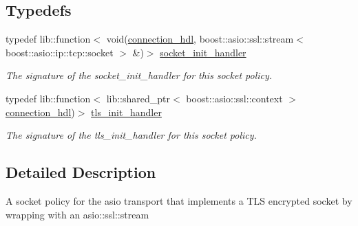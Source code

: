 \subsection*{Typedefs}
\begin{DoxyCompactItemize}
\item 
typedef lib\+::function$<$ void(\hyperlink{namespacewebsocketpp_a6b3d26a10ee7229b84b776786332631d}{connection\+\_\+hdl}, boost\+::asio\+::ssl\+::stream$<$ boost\+::asio\+::ip\+::tcp\+::socket $>$ \&)$>$ \hyperlink{namespacewebsocketpp_1_1transport_1_1asio_1_1tls__socket_a1d7e715c2f7c5fc7add88d6a37724abb}{socket\+\_\+init\+\_\+handler}\hypertarget{namespacewebsocketpp_1_1transport_1_1asio_1_1tls__socket_a1d7e715c2f7c5fc7add88d6a37724abb}{}\label{namespacewebsocketpp_1_1transport_1_1asio_1_1tls__socket_a1d7e715c2f7c5fc7add88d6a37724abb}

\begin{DoxyCompactList}\small\item\em The signature of the socket\+\_\+init\+\_\+handler for this socket policy. \end{DoxyCompactList}\item 
typedef lib\+::function$<$ lib\+::shared\+\_\+ptr$<$ boost\+::asio\+::ssl\+::context $>$\hyperlink{namespacewebsocketpp_a6b3d26a10ee7229b84b776786332631d}{connection\+\_\+hdl})$>$ \hyperlink{namespacewebsocketpp_1_1transport_1_1asio_1_1tls__socket_a8213f20abc47626ab3bf8db285fff3b3}{tls\+\_\+init\+\_\+handler}\hypertarget{namespacewebsocketpp_1_1transport_1_1asio_1_1tls__socket_a8213f20abc47626ab3bf8db285fff3b3}{}\label{namespacewebsocketpp_1_1transport_1_1asio_1_1tls__socket_a8213f20abc47626ab3bf8db285fff3b3}

\begin{DoxyCompactList}\small\item\em The signature of the tls\+\_\+init\+\_\+handler for this socket policy. \end{DoxyCompactList}\end{DoxyCompactItemize}


\subsection{Detailed Description}
A socket policy for the asio transport that implements a T\+LS encrypted socket by wrapping with an asio\+::ssl\+::stream 